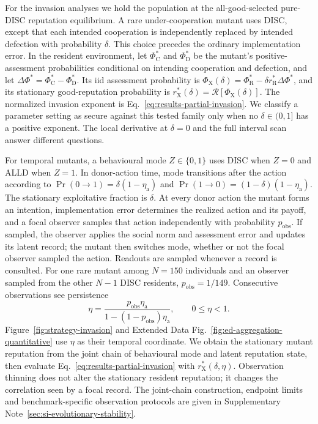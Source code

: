 \documentclass[fleqn,10pt]{wlscirep}
\begin{document}
For the invasion analyses we hold the population at the all-good-selected pure-DISC reputation equilibrium. A rare under-cooperation mutant uses DISC, except that each intended cooperation is independently replaced by intended defection with probability $\delta$. This choice precedes the ordinary implementation error. In the resident environment, let $\Phi_{\mathrm C}^*$ and $\Phi_{\mathrm D}^*$ be the mutant's positive-assessment probabilities conditional on intending cooperation and defection, and let $\Delta\Phi^*=\Phi_{\mathrm C}^*-\Phi_{\mathrm D}^*$. Its iid assessment probability is $\Phi_{\mathrm X}(\delta)=\Phi_{\mathrm R}^*-\delta r_{\mathrm R}^*\Delta\Phi^*$, and its stationary good-reputation probability is $r_{\mathrm X}^*(\delta)=\mathcal R[\Phi_{\mathrm X}(\delta)]$. The normalized invasion exponent is Eq.~\eqref{eq:results-partial-invasion}. We classify a parameter setting as secure against this tested family only when no $\delta\in(0,1]$ has a positive exponent. The local derivative at $\delta=0$ and the full interval scan answer different questions.

For temporal mutants, a behavioural mode $Z\in\{0,1\}$ uses DISC when $Z=0$ and ALLD when $Z=1$. In donor-action time, mode transitions after the action according to $\Pr(0\to1)=\delta(1-\eta_{\mathrm a})$ and $\Pr(1\to0)=(1-\delta)(1-\eta_{\mathrm a})$. The stationary exploitative fraction is $\delta$. At every donor action the mutant forms an intention, implementation error determines the realized action and its payoff, and a focal observer samples that action independently with probability $p_{\mathrm{obs}}$. If sampled, the observer applies the social norm and assessment error and updates its latent record; the mutant then switches mode, whether or not the focal observer sampled the action. Readouts are sampled whenever a record is consulted. For one rare mutant among $N=150$ individuals and an observer sampled from the other $N-1$ DISC residents, $p_{\mathrm{obs}}=1/149$. Consecutive observations see persistence
\begin{equation}
\eta=\frac{p_{\mathrm{obs}}\eta_{\mathrm a}}{1-(1-p_{\mathrm{obs}})\eta_{\mathrm a}},
\qquad 0\leq\eta<1.
\label{eq:methods-observed-persistence}
\end{equation}
Figure~\ref{fig:strategy-invasion} and Extended Data Fig.~\ref{fig:ed-aggregation-quantitative} use $\eta$ as their temporal coordinate. We obtain the stationary mutant reputation from the joint chain of behavioural mode and latent reputation state, then evaluate Eq.~\eqref{eq:results-partial-invasion} with $r_{\mathrm X}^*(\delta,\eta)$. Observation thinning does not alter the stationary resident reputation; it changes the correlation seen by a focal record. The joint-chain construction, endpoint limits and benchmark-specific observation protocols are given in Supplementary Note~\ref{sec:si-evolutionary-stability}.
\end{document}
